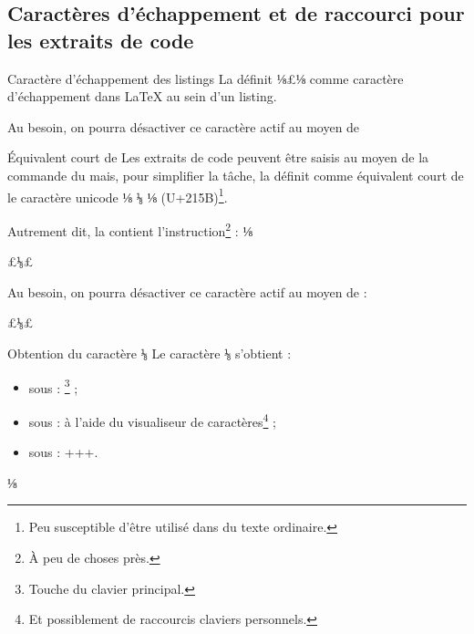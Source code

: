 \documentclass{letgut}
\begin{document}
\subsection{Caractères d'échappement et de raccourci pour les
  extraits de code}
\label{sec:caract-dech-et}

\begin{dbwarning}{Caractère d'échappement des listings}{}
  \lstset{escapechar=}%
  La  définit ⅛£⅛ comme caractère d'échappement dans \LaTeX{} au
  sein d'un listing.
\end{dbwarning}

Au besoin, on pourra désactiver ce caractère actif au moyen de
\begin{ltx-code}
\lstset{escapechar=}
\end{ltx-code}

\begin{dbwarning}{Équivalent court de }{}
  Les extraits de code peuvent être saisis au moyen de la commande
   du  mais, pour
  simplifier la tâche, la  définit comme équivalent court
  de  le caractère unicode %
  \lstDeleteShortInline⅛%
  \texttt{⅛} %
  \lstMakeShortInline⅛%
  (U+215B)\footnote{Peu susceptible d'être utilisé dans du texte
    ordinaire.}.
\end{dbwarning}

Autrement dit, la  contient l'instruction\footnote{À peu
  de choses près.} :
  \lstDeleteShortInline⅛
\begin{ltx-code}
\lstMakeShortInline£\texttt{⅛}£
\end{ltx-code}

  Au besoin, on pourra désactiver ce caractère actif au moyen de :
\begin{ltx-code}
\lstDeleteShortInline£\texttt{⅛}£
\end{ltx-code}

\begin{dbremark}{Obtention du caractère \texttt{⅛}}{}
Le caractère %
\texttt{⅛} %
s'obtient :
\begin{itemize}
\item sous \linux{} : \footnote{Touche  du clavier principal.} ;
\item sous \macos{} : à l'aide du visualiseur de caractères\footnote{Et
    possiblement de raccourcis claviers personnels.} ;
\item sous \windows{} : +++.
\end{itemize}
\end{dbremark}
  \lstMakeShortInline⅛%
\end{document}
